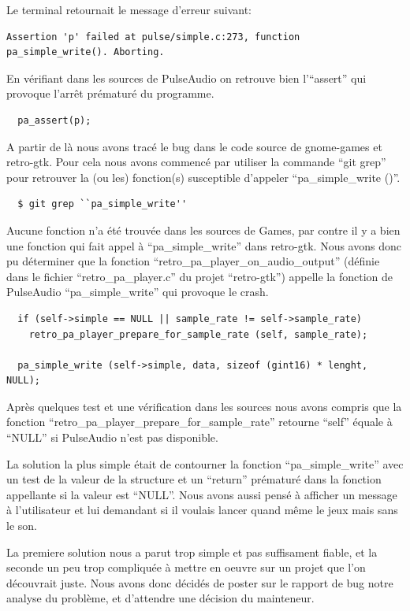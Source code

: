 \documentclass[12pt]{report}
\begin{document}
Le terminal retournait le message d'erreur suivant:
\begin{verbatim}
Assertion 'p' failed at pulse/simple.c:273, function pa_simple_write(). Aborting.
\end{verbatim}

En vérifiant dans les sources de PulseAudio on retrouve bien l'``assert'' qui provoque
l’arrêt prématuré du programme.
\begin{verbatim}
  pa_assert(p);
\end{verbatim}

A partir de là nous avons tracé le bug dans le code source de gnome-games et retro-gtk.
Pour cela nous avons commencé par utiliser la commande ``git grep'' pour retrouver
la (ou les) fonction(s) susceptible d'appeler ``pa\_simple\_write ()''.
\begin{verbatim}
  $ git grep ``pa_simple_write''
\end{verbatim}

Aucune fonction n'a été trouvée dans les sources de Games, par contre il y a bien
une fonction qui fait appel à ``pa\_simple\_write'' dans retro-gtk.
Nous avons donc pu déterminer que la fonction
``retro\_pa\_player\_on\_audio\_output'' (définie dans le fichier
``retro\_pa\_player.c'' du projet ``retro-gtk'') appelle la fonction de PulseAudio
``pa\_simple\_write'' qui provoque le crash.

\begin{verbatim}
  if (self->simple == NULL || sample_rate != self->sample_rate)
    retro_pa_player_prepare_for_sample_rate (self, sample_rate);

  pa_simple_write (self->simple, data, sizeof (gint16) * lenght, NULL);
\end{verbatim}
  
Après quelques test et une vérification dans les sources nous  avons compris
que la fonction ``retro\_pa\_player\_prepare\_for\_sample\_rate'' retourne ``self''
équale à ``NULL'' si PulseAudio n'est pas disponible.

La solution la plus simple était de contourner la fonction ``pa\_simple\_write''
avec un test de la valeur de la structure et un ``return'' prématuré dans la fonction
appellante si la valeur est ``NULL''. Nous avons aussi pensé à afficher un message à
l'utilisateur et lui demandant si il voulais lancer quand même le jeux mais sans le son.

La premiere solution nous a parut trop simple et pas suffisament fiable, et la
seconde un peu trop compliquée à mettre en oeuvre sur un projet que l'on découvrait juste.
Nous avons donc décidés de poster sur le rapport de bug notre analyse du problème, et
d'attendre une décision du mainteneur.
\end{document}
